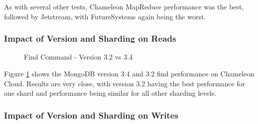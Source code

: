 \documentclass[sigconf]{acmart}
\begin{document}
As with several other tests, Chameleon MapReduce performance was the
best, followed by Jetstream, with FutureSystems again being the worst.


\subsubsection{Impact of Version and Sharding on Reads}


\begin{figure}[htbp]
\centering
{}
\caption{Find Command - Version 3.2 vs 3.4}
\label{fig:version-find}
\end{figure}

Figure \ref{fig:version-find} shows the MongoDB version 3.4 and 3.2
find performance on Chameleon Cloud.  Results are very close, with
version 3.2 having the best performance for one shard and performance
being similar for all other sharding levels.

\subsubsection{Impact of Version and Sharding on Writes}
\end{document}
